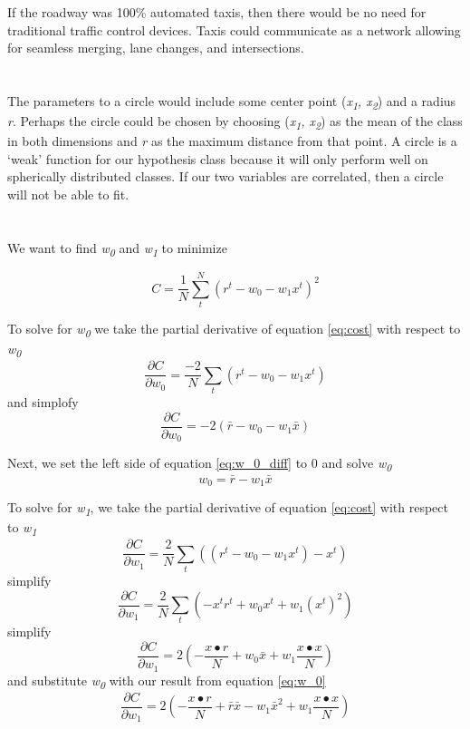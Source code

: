 \documentclass[12pt, letterpaper]{article}
\begin{document}
If the roadway was 100\% automated taxis, then there would be no need for traditional traffic control devices. Taxis could communicate as a network allowing for seamless merging, lane changes, and intersections.

\section{}
The parameters to a circle would include some center point (\textit{x\textsubscript{1}, x\textsubscript{2}}) and a radius \textit{r}. Perhaps the circle could be chosen by choosing (\textit{x\textsubscript{1}, x\textsubscript{2}}) as the mean of the class in both dimensions and \textit{r} as the maximum distance from that point. A circle is a ‘weak’ function for our hypothesis class because it will only perform well on spherically distributed classes. If our two variables are correlated, then a circle will not be able to fit.  

\section{}

We want to find \textit{w\textsubscript{0}} and \textit{w\textsubscript{1}} to minimize 

\begin{equation} \label{eq:cost}
C = \frac{1}{N} \sum_t^N (r^{t} - w_{0} - w_{1}x^{t})^2
\end{equation}

To solve for \textit{w\textsubscript{0}} we take the partial derivative of equation \ref{eq:cost} with respect to \textit{w\textsubscript{0}}
\[\frac{\partial C}{\partial w_0} = \frac{-2}{N} \sum_t(r^t - w_0 - w_1x^t)\]
and simplofy
\begin{equation} \label{eq:w_0_diff}
\frac{\partial C}{\partial w_0} = -2(\bar{r} - w_0 - w_1\bar{x})
\end{equation}

Next, we set the left side of equation \ref{eq:w_0_diff} to 0 and solve \textit{w\textsubscript{0}}
\begin{equation} \label{eq:w_0}
w_0 = \bar{r} - w_1\bar{x}
\end{equation}

To solve for \textit{w\textsubscript{1}}, we take the partial derivative of equation \ref{eq:cost} with respect to \textit{w\textsubscript{1}}
\[\frac{\partial C}{\partial w_1} = \frac{2}{N} \sum_t((r^t - w_0 - w_1x^t)-x^t)\]
simplify
\[\frac{\partial C}{\partial w_1} = \frac{2}{N} \sum_t(-x^tr^t + w_0x^t +w_1(x^t)^2)\]
simplify
\[\frac{\partial C}{\partial w_1} = 2 (- \frac{x  \bullet r}{N} + w_0\bar{x} +w_1\frac{x  \bullet x}{N})\]
and substitute \textit{w\textsubscript{0}} with our result from equation \ref{eq:w_0}
\begin{equation} \label{eq:w_1_diff}
\frac{\partial C}{\partial w_1} = 2 (- \frac{x  \bullet r}{N} + \bar{r}\bar{x} - w_1\bar{x}^2 +w_1\frac{x  \bullet x}{N})
\end{equation}
\end{document}
